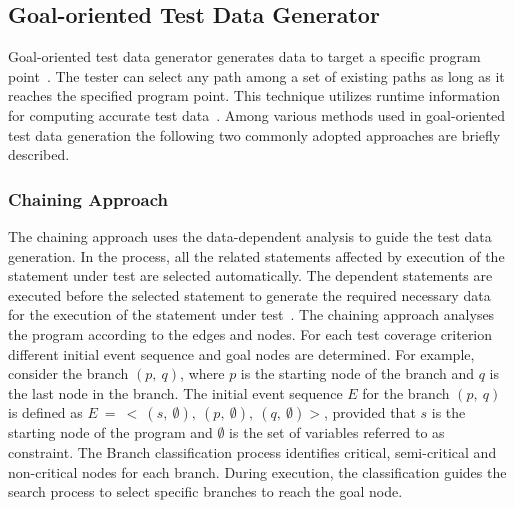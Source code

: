 

\subsection{Goal-oriented Test Data Generator}
\label{sec:goaloriented_2}
Goal-oriented test data generator generates data to target a specific program point~\cite{chungautomated}. The tester can select any path among a set of existing paths as long as it reaches the specified program point. This technique utilizes runtime information for computing accurate test data~\cite{ferguson1996chaining}. Among various methods used in goal-oriented test data generation the following two commonly adopted approaches are briefly described.

\subsubsection{Chaining Approach}
The chaining approach uses the data-dependent analysis to guide the test data generation. In the process, all the related statements affected by execution of the statement under test are selected automatically. The dependent statements are executed before the selected statement to generate the required necessary data for the execution of the statement under test~\cite{ferguson1996chaining}. The chaining approach analyses the program according to the edges and nodes. For each test coverage criterion different initial event sequence and goal nodes are determined. For example, consider  the branch $(p,~q)$, where $p$ is  the starting node of the branch and $q$ is the last node in the branch. The initial event sequence $E$ for the branch $(p,~q)$ is defined as $E~=~<~(s,~\emptyset),~(p,~\emptyset),~(q,~\emptyset) >$, provided that $s$ is the starting node of the program and $\emptyset$ is the set of variables referred to as constraint. The Branch classification process identifies critical, semi-critical and non-critical nodes for each branch. During execution, the classification guides the search process to select specific branches to reach the goal node.  

